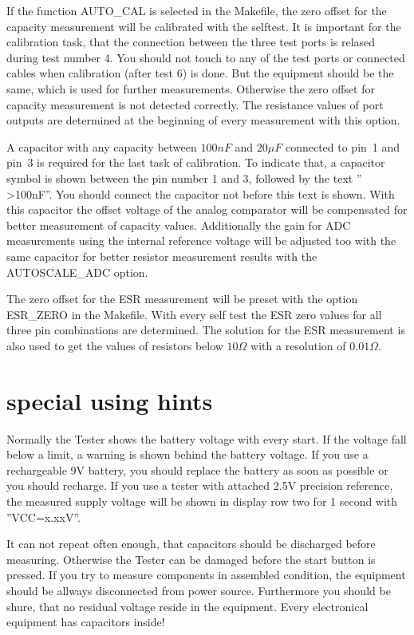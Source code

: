 If the function AUTO\_CAL is selected in the Makefile, 
the zero offset for the capacity measurement will be calibrated with the selftest.
It is important for the calibration task, that the connection between the three test ports is relased 
during test number 4. 
You should not touch to any of the test ports or connected cables when calibration (after test 6) is done.
But the equipment should be the same, which is used for further measurements.
Otherwise the zero offset for capacity measurement is not detected correctly.
The resistance values of port outputs are determined at the beginning of every measurement with this option.

A capacitor with any capacity between \(100 nF\) and \(20 \mu F\) connected to pin~1 and pin~3 is
required for the last task of calibration.
To indicate that, a capacitor symbol is shown between the pin number 1 and 3, followed by the text '' \textgreater 100nF''.
You should connect the capacitor not before this text is shown.
With this capacitor the offset voltage of the analog comparator will be compensated for better measurement
of capacity values.  
Additionally the gain for ADC measurements using the internal reference voltage will be adjusted too 
with the same capacitor for better resistor measurement results with the AUTOSCALE\_ADC option.

The zero offset for the ESR measurement will be preset with the option ESR\_ZERO in the Makefile.
With every self test the ESR zero values for all three pin combinations are determined.
The solution for the ESR measurement is also used to get the values of resistors below \(10 \Omega\) with
a resolution of \(0.01 \Omega\).


\section{special using hints}
Normally the Tester shows the battery voltage with every start. If the voltage fall below a limit,
a warning is shown behind the battery voltage. If you use a rechargeable 9V battery, you should replace
the battery as soon as possible or you should recharge.
If you use a tester with attached 2.5V precision reference, the measured supply voltage will be shown
in display row two for 1 second with ''VCC=x.xxV''.

It can not repeat often enough, that capacitors should be discharged before measuring.
Otherwise the Tester can be damaged before the start button is pressed.
If you try to measure components in assembled condition, the equipment should be allways disconnected from power source.
Furthermore you should be shure, that no residual voltage reside in the equipment.
Every electronical equipment has capacitors inside!

